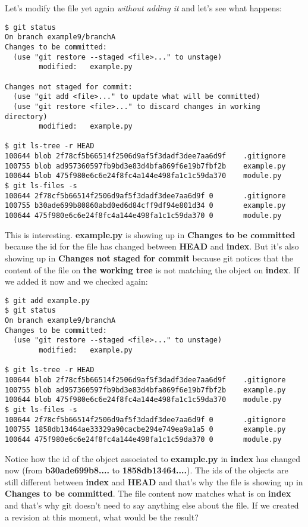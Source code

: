 Let's modify the file yet again {\it without adding it} and let's see what happens:

\begin{lstlisting}[style=console_style,
	basicstyle=\small,
	caption=After modifying staged file]
$ git status
On branch example9/branchA
Changes to be committed:
  (use "git restore --staged <file>..." to unstage)
        modified:   example.py

Changes not staged for commit:
  (use "git add <file>..." to update what will be committed)
  (use "git restore <file>..." to discard changes in working directory)
        modified:   example.py

$ git ls-tree -r HEAD
100644 blob 2f78cf5b66514f2506d9af5f3dadf3dee7aa6d9f    .gitignore
100755 blob ad957360597fb9bd3e83d4bfa869f6e19b7fbf2b    example.py
100644 blob 475f980e6c6e24f8fc4a144e498fa1c1c59da370    module.py
$ git ls-files -s
100644 2f78cf5b66514f2506d9af5f3dadf3dee7aa6d9f 0       .gitignore
100755 b30ade699b80860abd0ed6d84cff9df94e801d34 0       example.py
100644 475f980e6c6e24f8fc4a144e498fa1c1c59da370 0       module.py
\end{lstlisting}

This is interesting. {\bf example.py} is showing up in {\bf Changes to be committed} because the id for the file has changed between
{\bf HEAD} and {\bf index}. But it's also showing up in {\bf Changes not staged for commit} because git notices that the content of
the file on {\bf the working tree} is not matching the object on {\bf index}. If we added it now and we checked again:

\begin{lstlisting}[style=console_style,
	basicstyle=\small,
	caption=After adding file again]
$ git add example.py 
$ git status
On branch example9/branchA
Changes to be committed:
  (use "git restore --staged <file>..." to unstage)
        modified:   example.py

$ git ls-tree -r HEAD
100644 blob 2f78cf5b66514f2506d9af5f3dadf3dee7aa6d9f    .gitignore
100755 blob ad957360597fb9bd3e83d4bfa869f6e19b7fbf2b    example.py
100644 blob 475f980e6c6e24f8fc4a144e498fa1c1c59da370    module.py
$ git ls-files -s
100644 2f78cf5b66514f2506d9af5f3dadf3dee7aa6d9f 0       .gitignore
100755 1858db13464ae33329a90cacbe294e749ea9a1a5 0       example.py
100644 475f980e6c6e24f8fc4a144e498fa1c1c59da370 0       module.py
\end{lstlisting}

Notice how the id of the object associated to {\bf example.py} in {\bf index} has changed now (from
{\bf b30ade699b8....} to {\bf 1858db13464....}). The ids of the objects are still
different between {\bf index} and {\bf HEAD }and that's why the file is showing up in {\bf Changes to be committed}. The file content now
matches what is on {\bf index} and that's why git doesn't need to say anything else about the file. If we created a revision at this moment,
what would be the result?

